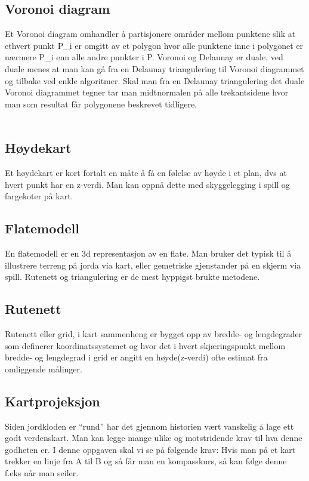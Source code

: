 \documentclass[norsk]{article}
\begin{document}
\subsection{Voronoi diagram}
Et Voronoi diagram omhandler å partisjonere områder mellom punktene slik at
ethvert punkt P_i er omgitt av et polygon hvor alle punktene inne i
polygonet er nærmere P_i enn alle andre punkter i P.
Voronoi og Delaunay er duale, ved duale menes at man kan gå fra en Delaunay
triangulering til Voronoi diagrammet og tilbake ved enkle algoritmer.
Skal man fra en Delaunay triangulering det duale Voronoi diagrammet tegner
tar man midtnormalen på alle trekantsidene hvor man som resultat får polygonene
beskrevet tidligere.
\\\\
\subsection{Høydekart}
Et høydekart er kort fortalt en måte å få en følelse av høyde i et
plan, dvs at hvert punkt har en z-verdi. Man kan oppnå dette med
skyggelegging i spill og fargekoter på kart.

\subsection{Flatemodell}
En flatemodell er en 3d representasjon av en flate. 
Man bruker det typisk til å illustrere terreng på jorda via kart, eller
gemetriske gjenstander på en skjerm via spill. Rutenett og triangulering 
er de mest hyppigst brukte metodene.

\subsection{Rutenett}
Rutenett eller grid, i kart sammenheng er bygget opp av bredde- og
lengdegrader som definerer koordinatssystemet og hvor det i hvert 
skjæringspunkt mellom bredde- og lengdegrad i grid er angitt en høyde(z-verdi)
ofte estimat fra omliggende målinger.

\subsection{Kartprojeksjon}
Siden jordkloden er ``rund'' har det gjennom historien vært vanskelig
å lage ett godt verdenskart. Man kan legge mange ulike og motstridende
krav til hva denne godheten er. I denne oppgaven skal vi se på
følgende krav: Hvis man på et kart trekker en linje fra A til B og
så får man en kompasskurs, så kan følge denne f.eks når man seiler. 
\end{document}

